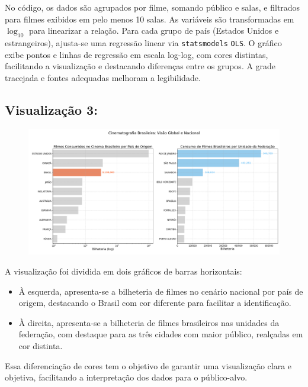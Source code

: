 \documentclass{article}
\begin{document}
No código, os dados são agrupados por filme, somando público e salas, e filtrados para filmes exibidos em pelo menos 10 salas. As variáveis são transformadas em \(\log_{10}\) para linearizar a relação. Para cada grupo de país (Estados Unidos e estrangeiros), ajusta-se uma regressão linear via \texttt{statsmodels} \texttt{OLS}. O gráfico exibe pontos e linhas de regressão em escala log-log, com cores distintas, facilitando a visualização e destacando diferenças entre os grupos. A grade tracejada e fontes adequadas melhoram a legibilidade.~\cite{tufte_visual_display}\cite{tufte_visual_explanations}

\subsection*{Visualização 3:}
\begin{figure}[H]
    \centerline{\includegraphics[width = \linewidth]{img/Figure_3.png}}
\end{figure}
A visualização foi dividida em dois gráficos de barras horizontais:

\begin{itemize}
    \item À esquerda, apresenta-se a bilheteria de filmes no cenário nacional por país de origem, destacando o Brasil com cor diferente para facilitar a identificação.
    \item À direita, apresenta-se a bilheteria de filmes brasileiros nas unidades da federação, com destaque para as três cidades com maior público, realçadas em cor distinta.
\end{itemize}

Essa diferenciação de cores tem o objetivo de garantir uma visualização clara e objetiva, facilitando a interpretação dos dados para o público-alvo. 

\vspace{0.3cm}
\end{document}
